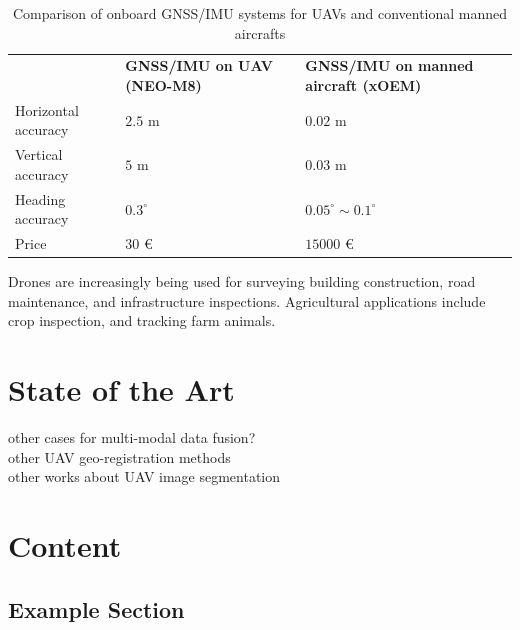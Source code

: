 \documentclass[%
  headings = standardclasses, %
]{tumDiss}
\begin{document}
\begin{table}[H]
  \begin{center}
  \small
  \begin{tabular}{@{}p{.23\linewidth}p{.25\linewidth}p{.4\linewidth}@{}}
    \toprule
    {} & {\textbf{GNSS/IMU on UAV (NEO-M8)}} & {\textbf{GNSS/IMU on manned aircraft (xOEM)}} \\
    \cmidrule(){1-3}
    Horizontal accuracy & $2.5$ m & $0.02$ m \\
    \midrule
    Vertical accuracy & $5$ m & $0.03$ m \\
    \midrule
Heading accuracy& $0.3^{\circ}$  & $0.05^{\circ}\sim0.1^{\circ}$\\
    \midrule
    Price & $30$ \euro{} & $15000$ \euro{}\\ 
    \bottomrule
  \end{tabular}
  \end{center}
  \caption {Comparison of onboard GNSS/IMU systems for UAVs and conventional manned aircrafts}
\label{tab:comp_acc}
\end{table}

Drones are increasingly being used for surveying building construction, road maintenance, and infrastructure inspections. Agricultural applications include crop inspection, and tracking farm animals. 




\chapter{State of the Art}
\label{chap:sota}
other cases for multi-modal data fusion?\\

other UAV geo-registration methods\\

other works about UAV image segmentation \\






\chapter{Content}
\label{chap:content}


\section{Example Section}
\end{document}
